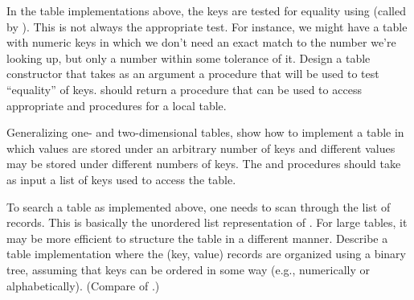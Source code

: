 \begin{exercise}
	\label{Exercise 3.24}
	In the table implementations above, the keys are tested for equality using  (called by ).
	This is not always the appropriate test.
	For instance, we might have a table with numeric keys in which we don’t need an exact match to the number we’re looking up, but only a number within some tolerance of it.
	Design a table constructor  that takes as an argument a  procedure that will be used to test “equality” of keys.
	 should return a  procedure that can be used to access appropriate  and  procedures for a local table.
\end{exercise}



\begin{exercise}
	\label{Exercise 3.25}
	Generalizing one- and two-dimensional tables, show how to implement a table in which values are stored under an arbitrary number of keys and different values may be stored under different numbers of keys.
	The  and  procedures should take as input a list of keys used to access the table.
\end{exercise}



\begin{exercise}
	\label{Exercise 3.26}
	To search a table as implemented above, one needs to scan through the list of records.
	This is basically the unordered list representation of .
	For large tables, it may be more efficient to structure the table in a different manner.
	Describe a table implementation where the (key, value) records are organized using a binary tree, assuming that keys can be ordered in some way (e.g., numerically or alphabetically).
	(Compare  of .)
\end{exercise}



